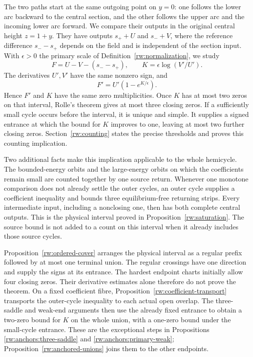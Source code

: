 The two paths start at the same outgoing point on $y=0$: one follows
the lower arc backward to the central section, and the other follows
the upper arc and the incoming lower arc forward. We compare their
outputs in the original central height $z=1+y$.
They have outputs $s_++U$ and $s_-+V$, where the reference
difference $s_--s_+$ depends on the field and is independent of the
section input. With $\epsilon>0$ the primary scale of
Definition~\ref{rw:normalization}, we study
\[
 F=U-V-(s_--s_+),\qquad
 K=\epsilon\log(V'/U').
\]
The derivatives $U',V'$ have the same nonzero sign, and
\[
 F'=U'(1-e^{K/\epsilon}).
\]
Hence $F'$ and $K$ have the same zero multiplicities. Once $K$ has
at most two zeros on that interval, Rolle's theorem gives at most
three closing zeros. If a sufficiently small cycle occurs before
the interval, it is unique and simple. It supplies a signed entrance
at which the bound for $K$ improves to one, leaving at most two
further closing zeros. Section~\ref{rw:counting} states the precise
thresholds and proves this counting implication.

Two additional facts make this implication applicable to the whole
hemicycle. The bounded-energy orbits and the large-energy orbits on
which the coefficients remain small are counted together by one
source return. Whenever one monotone comparison does not already
settle the outer cycles, an outer cycle supplies a coefficient
inequality and bounds three equilibrium-free returning strips.
Every intermediate input, including a nonclosing one, then
has both complete central outputs. This is the physical interval
proved in Proposition~\ref{rw:saturation}. The source bound is not
added to a count on this interval when it already includes those
source cycles.

Proposition~\ref{rw:ordered-cover} arranges the physical interval as
a regular prefix followed by at most one terminal union. The regular
crossings have one direction and supply the signs at its entrance.
The hardest endpoint charts initially allow four closing zeros.
Their derivative estimates alone therefore do not prove the theorem.
On a fixed coefficient fibre, Proposition~\ref{rw:coefficient-transport}
transports the outer-cycle inequality to each actual open overlap.
The three-saddle and weak-end arguments then use the already fixed
entrance to obtain a two-zero bound for $K$ on the whole union,
with a one-zero bound under the small-cycle entrance.
These are the exceptional steps in Propositions
\ref{rw:anchors:three-saddle} and \ref{rw:anchors:primary-weak};
Proposition~\ref{rw:anchored-unions} joins them to the other endpoints.

